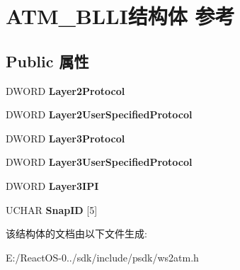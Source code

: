 \hypertarget{struct_a_t_m___b_l_l_i}{}\section{A\+T\+M\+\_\+\+B\+L\+L\+I结构体 参考}
\label{struct_a_t_m___b_l_l_i}
\subsection*{Public 属性}
\begin{DoxyCompactItemize}
\item 
\mbox{\label{struct_a_t_m___b_l_l_i_abb0b9ae11d56d54041835871755e6d0e}} 
D\+W\+O\+RD {\bfseries Layer2\+Protocol}
\item 
\mbox{\label{struct_a_t_m___b_l_l_i_a10867371974f691c89cce8880902845d}} 
D\+W\+O\+RD {\bfseries Layer2\+User\+Specified\+Protocol}
\item 
\mbox{\label{struct_a_t_m___b_l_l_i_a42c470e558de38698f14ab19d907082c}} 
D\+W\+O\+RD {\bfseries Layer3\+Protocol}
\item 
\mbox{\label{struct_a_t_m___b_l_l_i_af43bb460d92580de384461d4689043dd}} 
D\+W\+O\+RD {\bfseries Layer3\+User\+Specified\+Protocol}
\item 
\mbox{\label{struct_a_t_m___b_l_l_i_a104f106800aa371539bca791e8a75b03}} 
D\+W\+O\+RD {\bfseries Layer3\+I\+PI}
\item 
\mbox{\label{struct_a_t_m___b_l_l_i_af05e6e5ebe2d11d56a70117186c132b1}} 
U\+C\+H\+AR {\bfseries Snap\+ID} \mbox{[}5\mbox{]}
\end{DoxyCompactItemize}


该结构体的文档由以下文件生成\+:\begin{DoxyCompactItemize}
\item 
E\+:/\+React\+O\+S-\/0../sdk/include/psdk/ws2atm.\+h\end{DoxyCompactItemize}
